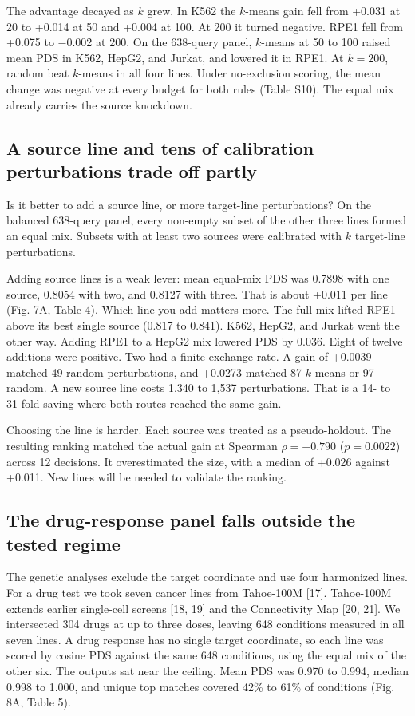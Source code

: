 \documentclass[12pt]{article}
\begin{document}
The advantage decayed as $k$ grew. In K562 the $k$-means gain fell from +0.031 at 20 to +0.014 at 50 and +0.004 at 100. At 200 it turned negative. RPE1 fell from +0.075 to $-$0.002 at 200. On the 638-query panel, $k$-means at 50 to 100 raised mean PDS in K562, HepG2, and Jurkat, and lowered it in RPE1. At $k = 200$, random beat $k$-means in all four lines. Under no-exclusion scoring, the mean change was negative at every budget for both rules (Table S10). The equal mix already carries the source knockdown.

\subsection{A source line and tens of calibration perturbations trade off partly}

Is it better to add a source line, or more target-line perturbations? On the balanced 638-query panel, every non-empty subset of the other three lines formed an equal mix. Subsets with at least two sources were calibrated with $k$ target-line perturbations.

Adding source lines is a weak lever: mean equal-mix PDS was 0.7898 with one source, 0.8054 with two, and 0.8127 with three. That is about +0.011 per line (Fig. 7A, Table 4). Which line you add matters more. The full mix lifted RPE1 above its best single source (0.817 to 0.841). K562, HepG2, and Jurkat went the other way. Adding RPE1 to a HepG2 mix lowered PDS by 0.036. Eight of twelve additions were positive. Two had a finite exchange rate. A gain of +0.0039 matched 49 random perturbations, and +0.0273 matched 87 $k$-means or 97 random. A new source line costs 1,340 to 1,537 perturbations. That is a 14- to 31-fold saving where both routes reached the same gain.

Choosing the line is harder. Each source was treated as a pseudo-holdout. The resulting ranking matched the actual gain at Spearman $\rho = +0.790$ ($p = 0.0022$) across 12 decisions. It overestimated the size, with a median of +0.026 against +0.011. New lines will be needed to validate the ranking.

\subsection{The drug-response panel falls outside the tested regime}

The genetic analyses exclude the target coordinate and use four harmonized lines. For a drug test we took seven cancer lines from Tahoe-100M [17]. Tahoe-100M extends earlier single-cell screens [18, 19] and the Connectivity Map [20, 21]. We intersected 304 drugs at up to three doses, leaving 648 conditions measured in all seven lines. A drug response has no single target coordinate, so each line was scored by cosine PDS against the same 648 conditions, using the equal mix of the other six. The outputs sat near the ceiling. Mean PDS was 0.970 to 0.994, median 0.998 to 1.000, and unique top matches covered 42\% to 61\% of conditions (Fig. 8A, Table 5).
\end{document}
